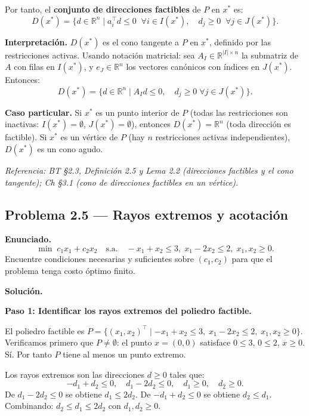 \documentclass{article}
\begin{document}
Por tanto, el \textbf{conjunto de direcciones factibles} de $P$ en $x^*$ es:
\[
\boxed{D(x^*) = \{d \in \mathbb{R}^n \mid a_i^\top d \leq 0 \;\;\forall i \in I(x^*),\quad d_j \geq 0 \;\;\forall j \in J(x^*)\}.}
\]

\textbf{Interpretación.} $D(x^*)$ es el cono tangente a $P$ en $x^*$, definido por las restricciones activas. Usando notación matricial: sea $A_{I} \in \mathbb{R}^{|I| \times n}$ la submatriz de $A$ con filas en $I(x^*)$, y $e_{J} \in \mathbb{R}^{n}$ los vectores canónicos con índices en $J(x^*)$. Entonces:
\[
D(x^*) = \{d \in \mathbb{R}^n \mid A_I d \leq 0, \quad d_j \geq 0 \;\forall j \in J(x^*)\}.
\]

\textbf{Caso particular.} Si $x^*$ es un punto interior de $P$ (todas las restricciones son inactivas: $I(x^*) = \emptyset$, $J(x^*) = \emptyset$), entonces $D(x^*) = \mathbb{R}^n$ (toda dirección es factible). Si $x^*$ es un vértice de $P$ (hay $n$ restricciones activas independientes), $D(x^*)$ es un cono agudo.

\medskip\noindent\textit{Referencia: BT §2.3, Definición 2.5 y Lema 2.2 (direcciones factibles y el cono tangente); Ch §3.1 (cono de direcciones factibles en un vértice).}

\newpage
\subsection*{Problema 2.5 — Rayos extremos y acotación}

\textbf{Enunciado.}
\[
\min\; c_1 x_1 + c_2 x_2 \quad \text{s.a.}\quad -x_1 + x_2 \leq 3,\; x_1 - 2x_2 \leq 2,\; x_1, x_2 \geq 0.
\]
Encuentre condiciones necesarias y suficientes sobre $(c_1, c_2)$ para que el problema tenga costo óptimo finito.

\medskip
\noindent\textbf{Solución.}

\textbf{Paso 1: Identificar los rayos extremos del poliedro factible.}

El poliedro factible es $P = \{(x_1, x_2)^\top \mid -x_1 + x_2 \leq 3,\; x_1 - 2x_2 \leq 2,\; x_1, x_2 \geq 0\}$. Verificamos primero que $P \neq \emptyset$: el punto $x = (0,0)$ satisface $0 \leq 3$, $0 \leq 2$, $x \geq 0$. Sí. Por tanto $P$ tiene al menos un punto extremo.

Los rayos extremos son las direcciones $d \geq 0$ tales que:
\[
-d_1 + d_2 \leq 0, \quad d_1 - 2d_2 \leq 0, \quad d_1 \geq 0, \quad d_2 \geq 0.
\]
De $d_1 - 2d_2 \leq 0$ se obtiene $d_1 \leq 2d_2$. De $-d_1 + d_2 \leq 0$ se obtiene $d_2 \leq d_1$. Combinando: $d_2 \leq d_1 \leq 2d_2$ con $d_1, d_2 \geq 0$.
\end{document}
